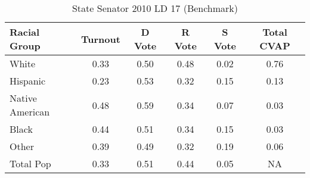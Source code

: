 \begin{table}[htb]
\begin{center}
\caption{State Senator 2010 LD 17 (Benchmark)}
\label{stsen10_cvap_ld_17_benchmark}
\begin{tabular}{lccccc}
  \hline
Racial Group & Turnout & D Vote & R Vote & S Vote & Total CVAP \\ 
  \hline
    White & 0.33  & 0.50  & 0.48  & 0.02  & 0.76 \\
    Hispanic & 0.23  & 0.53  & 0.32  & 0.15  & 0.13 \\
    Native American & 0.48  & 0.59  & 0.34  & 0.07  & 0.03 \\
    Black & 0.44  & 0.51  & 0.34  & 0.15  & 0.03 \\
    Other & 0.39  & 0.49  & 0.32  & 0.19  & 0.06 \\
    Total Pop & 0.33  & 0.51  & 0.44  & 0.05  & NA \\   
   \hline
\end{tabular}
\end{center}
\end{table}